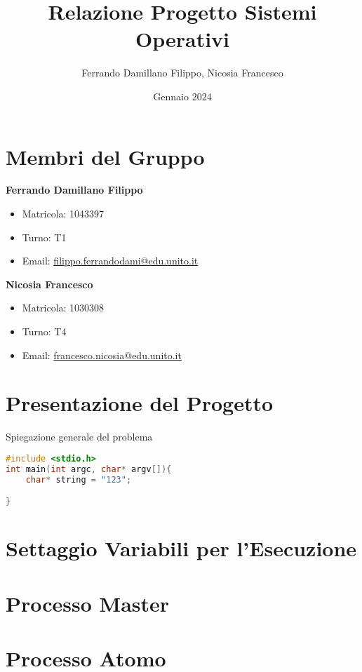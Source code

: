 \documentclass{article}
\title{Relazione Progetto Sistemi Operativi}
\author{Ferrando Damillano Filippo, Nicosia Francesco}
\date{Gennaio 2024}
\begin{document}
\maketitle

\tableofcontents

\section{Membri del Gruppo}

\textbf{Ferrando Damillano Filippo}
\begin{itemize}
    \item Matricola: 1043397
    \item Turno: T1    
    \item Email: \href{mailto:filippo.ferrandodami@edu.unito.it}{filippo.ferrandodami@edu.unito.it}
\end{itemize}
\textbf{Nicosia Francesco}
\begin{itemize}
    \item Matricola: 1030308
    \item Turno: T4
    \item Email: \href{mailto:francesco.nicosia@edu.unito.it}{francesco.nicosia@edu.unito.it}
\end{itemize}

\section{Presentazione del Progetto}
Spiegazione generale del problema

\begin{lstlisting}[language=C]
#include <stdio.h>
int main(int argc, char* argv[]){
    char* string = "123";

}
\end{lstlisting}

\section{Settaggio Variabili per l'Esecuzione}

\section{Processo Master}

\section{Processo Atomo}
\end{document}
